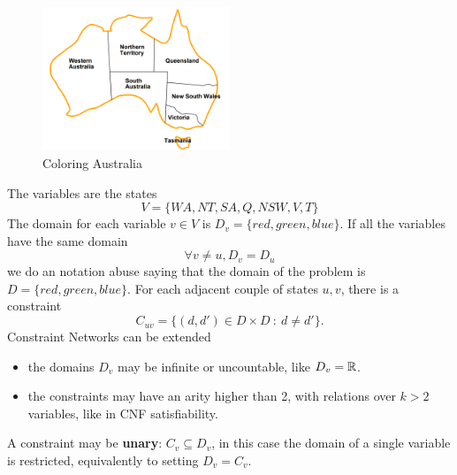\documentclass[10pt, letterpaper]{report}
\begin{document}
\begin{figure}[h!]
    \centering
    \includegraphics[width=0.5\textwidth ]{images/australia.png}
    \caption{Coloring Australia}
    \label{fig:australia}
\end{figure}

The variables are the states 
$$ V=\{WA,NT,SA,Q,NSW,V,T\}$$
The domain for each variable $v\in V$ is $D_v=\{red,green,blue\}$.
If all the variables have the same domain \begin{equation}
    \forall v\ne u, D_v=D_u
\end{equation}
we do an notation abuse saying that the domain of the problem is $D=\{red,green,blue\}$.
For each adjacent couple of states $u,v$, there is a constraint
$$C_{uv}=\{(d,d')\in D\times D \ : \ d\ne d'\}.$$
Constraint Networks can be extended\begin{itemize}
    \item the domains $D_v$ may be infinite or uncountable, like $D_v={\mathbb R}$.
    \item the constraints may have an arity higher than 2, with relations over $k>2$ variables, like in CNF satisfiability.
\end{itemize}
A constraint may be \textbf{unary}: $C_v\subseteq D_v$, in this case the domain of a single variable is restricted, equivalently to setting $D_v=C_v$.\bigskip 
\end{document}
